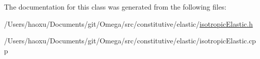 The documentation for this class was generated from the following files\+:\begin{DoxyCompactItemize}
\item 
/\+Users/haoxu/\+Documents/git/\+Omega/src/constitutive/elastic/\hyperlink{isotropic_elastic_8h}{isotropic\+Elastic.\+h}\item 
/\+Users/haoxu/\+Documents/git/\+Omega/src/constitutive/elastic/isotropic\+Elastic.\+cpp\end{DoxyCompactItemize}
